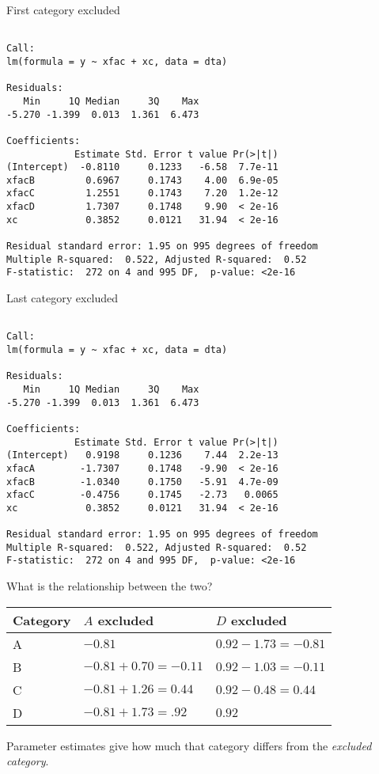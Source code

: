 \documentclass[10pt,ignorenonframetext,]{beamer}
\begin{document}
\begin{frame}[fragile]{First category excluded}

\begin{verbatim}

Call:
lm(formula = y ~ xfac + xc, data = dta)

Residuals:
   Min     1Q Median     3Q    Max
-5.270 -1.399  0.013  1.361  6.473

Coefficients:
            Estimate Std. Error t value Pr(>|t|)
(Intercept)  -0.8110     0.1233   -6.58  7.7e-11
xfacB         0.6967     0.1743    4.00  6.9e-05
xfacC         1.2551     0.1743    7.20  1.2e-12
xfacD         1.7307     0.1748    9.90  < 2e-16
xc            0.3852     0.0121   31.94  < 2e-16

Residual standard error: 1.95 on 995 degrees of freedom
Multiple R-squared:  0.522, Adjusted R-squared:  0.52
F-statistic:  272 on 4 and 995 DF,  p-value: <2e-16
\end{verbatim}

\end{frame}

\begin{frame}[fragile]{Last category excluded}

\begin{verbatim}

Call:
lm(formula = y ~ xfac + xc, data = dta)

Residuals:
   Min     1Q Median     3Q    Max
-5.270 -1.399  0.013  1.361  6.473

Coefficients:
            Estimate Std. Error t value Pr(>|t|)
(Intercept)   0.9198     0.1236    7.44  2.2e-13
xfacA        -1.7307     0.1748   -9.90  < 2e-16
xfacB        -1.0340     0.1750   -5.91  4.7e-09
xfacC        -0.4756     0.1745   -2.73   0.0065
xc            0.3852     0.0121   31.94  < 2e-16

Residual standard error: 1.95 on 995 degrees of freedom
Multiple R-squared:  0.522, Adjusted R-squared:  0.52
F-statistic:  272 on 4 and 995 DF,  p-value: <2e-16
\end{verbatim}

\end{frame}

\begin{frame}{What is the relationship between the two?}

\begin{longtable}[]{@{}lll@{}}
\toprule
Category & \(A\) excluded & \(D\) excluded\tabularnewline
\midrule
\endhead
A & \(-0.81\) & \(0.92 - 1.73 = -0.81\)\tabularnewline
B & \(-0.81 + 0.70 = -0.11\) & \(0.92 - 1.03 = -0.11\)\tabularnewline
C & \(-0.81 + 1.26 = 0.44\) & \(0.92 - 0.48 = 0.44\)\tabularnewline
D & \(-0.81 + 1.73 = .92\) & \(0.92\)\tabularnewline
\bottomrule
\end{longtable}

Parameter estimates give how much that category differs from the
\emph{excluded category}.

\end{frame}
\end{document}
